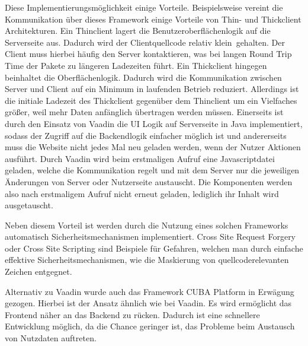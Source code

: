Diese Implementierungsmöglichkeit einige Vorteile. Beispielsweise vereint die Kommunikation über dieses Framework einige Vorteile von Thin- und Thickclient Architekturen. Ein Thinclient lagert die Benutzeroberflächenlogik auf die Serverseite aus. Dadurch wird der Clientquellcode relativ \glqq klein\grqq \ gehalten. Der Client muss hierbei häufig den Server kontaktieren, was bei langen Round Trip Time der Pakete zu längeren Ladezeiten führt. Ein Thickclient hingegen beinhaltet die Oberflächenlogik. Dadurch wird die Kommunikation zwischen Server und Client auf ein Minimum in laufenden Betrieb reduziert. Allerdings ist die initiale Ladezeit des Thickclient gegenüber dem Thinclient um ein Vielfaches größer, weil mehr Daten anfänglich übertragen werden müssen. Einerseits ist durch den Einsatz von Vaadin die UI Logik auf Serverseite in Java implementiert, sodass der Zugriff auf die Backendlogik einfacher möglich ist und andererseits muss die Website nicht jedes Mal neu geladen werden, wenn der Nutzer Aktionen ausführt. Durch Vaadin wird beim erstmaligen Aufruf eine Javascriptdatei geladen, welche die Kommunikation regelt und mit dem Server nur die jeweiligen Änderungen von Server oder Nutzerseite austauscht. Die Komponenten werden also nach erstmaligem Aufruf nicht erneut geladen, lediglich ihr Inhalt wird ausgetauscht.

Neben diesem Vorteil ist werden durch die Nutzung eines solchen Frameworks automatisch Sicherheitsmechanismen implementiert. Cross Site Request Forgery oder Cross Site Scripting sind Beispiele für Gefahren, welchen man durch einfache effektive Sicherheitsmechanismen, wie die Maskierung von quellcoderelevanten Zeichen entgegnet.

Alternativ zu Vaadin wurde auch das Framework CUBA Platform \autocite[vgl.][]{CUBAPlatform} in Erwägung gezogen. Hierbei ist der Ansatz ähnlich wie bei Vaadin. Es wird ermöglicht das Frontend näher an das Backend zu rücken. Dadurch ist eine schnellere Entwicklung möglich, da die Chance geringer ist, das Probleme beim Austausch von Nutzdaten auftreten. 

